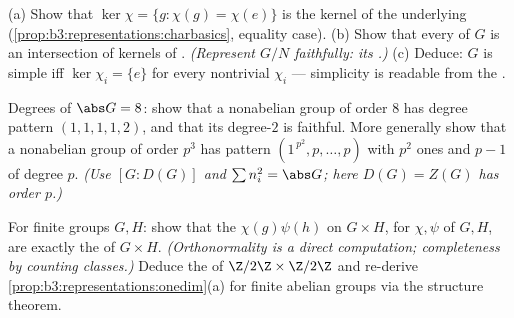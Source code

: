 \begin{exercise}[$\star\star$]\label{exo:b3:representations:6}
(a) Show that $\ker\chi = \{g : \chi(g) = \chi(e)\}$ is the
kernel of the underlying 
(\cref{prop:b3:representations:charbasics}, equality case).
(b) Show that every  of $G$ is an intersection of
kernels of  . \emph{(Represent $G/N$
faithfully: its .)}
(c) Deduce: $G$ is simple iff $\ker\chi_i = \{e\}$ for every
nontrivial  $\chi_i$ --- simplicity is readable from
the .
\end{exercise}

\begin{exercise}[$\star\star$]\label{exo:b3:representations:7}
Degrees of $\abs G = 8$: show that a nonabelian group of order
$8$ has degree pattern $(1,1,1,1,2)$, and that its degree-$2$
 is faithful. More generally show that a
nonabelian group of order $p^3$ has pattern $(1^{\,p^2},
p, \dots, p)$ with $p^2$ ones and $p - 1$  of degree
$p$. \emph{(Use $[G : D(G)]$ and $\sum n_i^2 = \abs G$; here
$D(G) = Z(G)$ has order $p$.)}
\end{exercise}

\begin{exercise}[$\star\star\star$]\label{exo:b3:representations:8}
For finite groups $G, H$: show that the 
$\chi(g)\psi(h)$ on $G \times H$, for $\chi, \psi$ 
 of $G, H$, are exactly the   of
$G \times H$. \emph{(Orthonormality is a direct computation;
completeness by counting classes.)} Deduce the 
of $\Z/2\Z \times \Z/2\Z$ and re-derive
\cref{prop:b3:representations:onedim}(a) for finite abelian
groups via the structure theorem.
\end{exercise}

